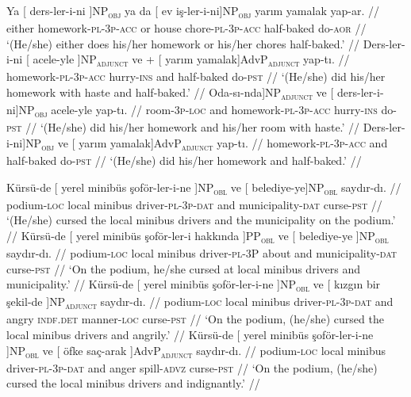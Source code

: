 \pex[exno=TS11, glspace=!1em,everygla={},everyglb={},aboveglbskip=-.15ex, interpartskip=15pt]
\label{TS11}
\a
\begingl
\gla Ya {[} {ders-ler-i-ni ]}NP\textsubscript{\textsc{obj}} {ya da} {[} ev {iş-ler-i-ni]}NP\textsubscript{\textsc{obj}} {yarım yamalak} yap-ar. //
\glb either homework-\textsc{pl}-\textsc{3p}-\textsc{acc} or house chore-\textsc{pl}-\textsc{3p}-\textsc{acc} {half-baked} do-\textsc{aor} //
\glft `(He/she) either does his/her homework or his/her chores half-baked.' //
\endgl
\a
\begingl
\gla Ders-ler-i-ni {[} {acele-yle ]}NP\textsubscript{\textsc{adjunct}} ve + {[} {{yarım yamalak}]}AdvP\textsubscript{\textsc{adjunct}} yap-tı. //
\glb homework-\textsc{pl}-\textsc{3p}-\textsc{acc} hurry-\textsc{ins} and {half-baked} do-\textsc{pst} //
\glft `(He/she) did his/her homework with haste and half-baked.' //
\endgl
\a
\begingl
\gla {[} {Oda-sı-nda]}NP\textsubscript{\textsc{adjunct}} ve {[} {ders-ler-i-ni]}NP\textsubscript{\textsc{obj}} acele-yle yap-tı. //
\glb room-\textsc{3p}-\textsc{loc} and homework-\textsc{pl}-\textsc{3p}-\textsc{acc} hurry-\textsc{ins} do-\textsc{pst} //
\glft `(He/she) did his/her homework and his/her room with haste.' //
\endgl
\a
\begingl
\gla {[} {Ders-ler-i-ni]}NP\textsubscript{\textsc{obj}} ve {[} {{yarım yamalak}]}AdvP\textsubscript{\textsc{adjunct}} yap-tı. //
\glb homework-\textsc{pl}-\textsc{3p}-\textsc{acc} and {half-baked} do-\textsc{pst} //
\glft `(He/she) did his/her homework and half-baked.' //
\endgl
\xe


\pex[exno=TS12, glspace=!1em,everygla={},everyglb={},aboveglbskip=-.15ex, interpartskip=15pt]
\label{TS12}
\a
\begingl
\gla Kürsü-de {[} yerel minibüs {şoför-ler-i-ne ]}NP\textsubscript{\textsc{obl}} ve {[} {belediye-ye]}NP\textsubscript{\textsc{obl}} saydır-dı. //
\glb podium-\textsc{loc} local minibus driver-\textsc{pl}-\textsc{3p}-\textsc{dat} and municipality-\textsc{dat} curse-\textsc{pst} //
\glft `(He/she) cursed the local minibus drivers and the municipality on the podium.' //
\endgl
\a
\begingl
\gla Kürsü-de {[} yerel minibüs şoför-ler-i {hakkında ]}PP\textsubscript{\textsc{obl}} ve {[} {belediye-ye ]}NP\textsubscript{\textsc{obl}} saydır-dı. //
\glb podium-\textsc{loc} local minibus driver-\textsc{pl}-\textsc{3P} about and municipality-\textsc{dat} curse-\textsc{pst} //
\glft `On the podium, he/she cursed at local minibus drivers and municipality.' //
\endgl
\a
\begingl
\gla Kürsü-de {[} yerel minibüs {şoför-ler-i-ne ]}NP\textsubscript{\textsc{obl}} ve {[} kızgın bir {şekil-de ]}NP\textsubscript{\textsc{adjunct}}  saydır-dı. //
\glb podium-\textsc{loc} local minibus driver-\textsc{pl}-\textsc{3p}-\textsc{dat} and angry \textsc{indf.det} manner-\textsc{loc} curse-\textsc{pst} //
\glft `On the podium, (he/she) cursed the local minibus drivers and angrily.' //
\endgl
\a
\begingl
\gla Kürsü-de {[} yerel minibüs {şoför-ler-i-ne ]}NP\textsubscript{\textsc{obl}} ve {[} öfke {saç-arak ]}AdvP\textsubscript{\textsc{adjunct}}  saydır-dı. //
\glb podium-\textsc{loc} local minibus driver-\textsc{pl}-\textsc{3p}-\textsc{dat} and anger spill-\textsc{advz} curse-\textsc{pst} //
\glft `On the podium, (he/she) cursed the local minibus drivers and indignantly.' //
\endgl
\xe


